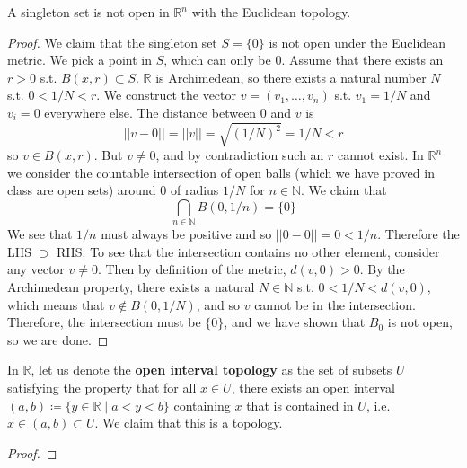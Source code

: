     \begin{corollary}
      A singleton set is not open in $\mathbb{R}^n$ with the Euclidean topology.   
    \end{corollary}
    \begin{proof}
      We claim that the singleton set $S = \{0\}$ is not open under the Euclidean metric. We pick a point in $S$, which can only be $0$. Assume that there exists an $r > 0$ s.t. $B(x, r) \subset S$. $\mathbb{R}$ is Archimedean, so there exists a natural number $N$ s.t. $0 < 1/N < r$. We construct the vector $v = (v_1, \ldots, v_n)$ s.t. $v_1 = 1/N$ and $v_i = 0$ everywhere else. The distance between $0$ and $v$ is 
      \begin{equation}
        || v - 0 || = ||v|| = \sqrt{(1/N)^2} = 1/N < r
      \end{equation} 
      so $v \in B(x, r)$. But $v \neq 0$, and by contradiction such an $r$ cannot exist. In $\mathbb{R}^n$ we consider the countable intersection of open balls (which we have proved in class are open sets) around $0$ of radius $1/N$ for $n \in \mathbb{N}$. We claim that 
      \begin{equation}
        \bigcap_{n \in \mathbb{N}} B(0, 1/n) = \{0\}
      \end{equation} 
      We see that $1/n$ must always be positive and so $||0 - 0|| = 0 < 1/n$. Therefore the LHS $\supset $ RHS. To see that the intersection contains no other element, consider any vector $v \neq 0$. Then by definition of the metric, $d(v, 0) > 0$. By the Archimedean property, there exists a natural $N \in \mathbb{N}$ s.t. $0 < 1/N < d(v, 0)$, which means that $v \not\in B(0, 1/N)$, and so $v$ cannot be in the intersection. Therefore, the intersection must be $\{0\}$, and we have shown that $B_0$ is not open, so we are done. 
    \end{proof}

    \begin{theorem}
      In $\mathbb{R}$, let us denote the \textbf{open interval topology} as the set of subsets $U$ satisfying the property that for all $x \in U$, there exists an open interval $(a, b) \coloneqq \{y \in \mathbb{R} \mid a < y < b\}$ containing $x$ that is contained in $U$, i.e. $x \in (a, b) \subset U$. We claim that this is a topology. 
    \end{theorem}
    \begin{proof}
      
    \end{proof}

